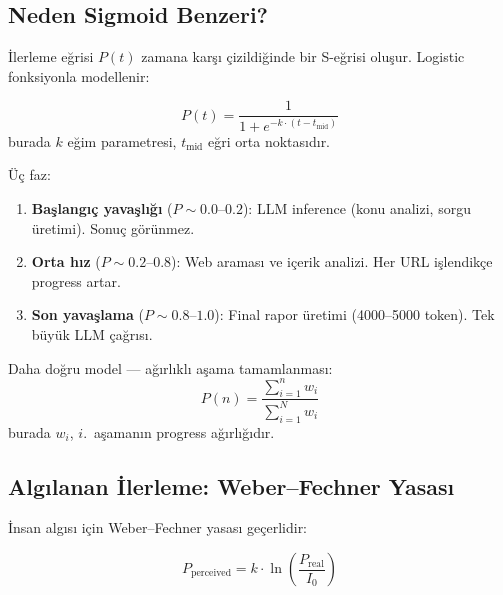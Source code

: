\subsection{Neden Sigmoid Benzeri?}

\.{I}lerleme e\u{g}risi $P(t)$ zamana kar\c{s}{\i} \c{c}izildi\u{g}inde bir S-e\u{g}risi olu\c{s}ur. Logistic fonksiyonla modellenir:

\begin{formulbox}
\begin{equation}
\label{eq:sigmoid_progress}
P(t) = \frac{1}{1 + e^{-k \cdot (t - t_{\text{mid}})}}
\end{equation}
burada $k$ e\u{g}im parametresi, $t_{\text{mid}}$ e\u{g}ri orta noktas{\i}d{\i}r.
\end{formulbox}

\"{U}\c{c} faz:\
\begin{enumerate}
  \item \textbf{Ba\c{s}lang{\i}\c{c} yava\c{s}l{\i}\u{g}{\i}} ($P \sim 0.0$--$0.2$): LLM inference (konu analizi, sorgu \"{u}retimi). Sonu\c{c} g\"{o}r\"{u}nmez.
  \item \textbf{Orta h{\i}z} ($P \sim 0.2$--$0.8$): Web aramas{\i} ve i\c{c}erik analizi. Her URL i\c{s}lendik\c{c}e progress artar.
  \item \textbf{Son yava\c{s}lama} ($P \sim 0.8$--$1.0$): Final rapor \"{u}retimi (4000--5000 token). Tek b\"{u}y\"{u}k LLM \c{c}a\u{g}r{\i}s{\i}.
\end{enumerate}

Daha do\u{g}ru model --- a\u{g}{\i}rl{\i}kl{\i} a\c{s}ama tamamlanmas{\i}:
\begin{equation}
\label{eq:weighted_progress}
P(n) = \frac{\sum_{i=1}^{n} w_i}{\sum_{i=1}^{N} w_i}
\end{equation}
burada $w_i$, $i$.~a\c{s}aman{\i}n progress a\u{g}{\i}rl{\i}\u{g}{\i}d{\i}r.

\subsection{Alg{\i}lanan \.{I}lerleme: Weber--Fechner Yasas{\i}}

\.{I}nsan alg{\i}s{\i} i\c{c}in Weber--Fechner yasas{\i} ge\c{c}erlidir:

\begin{equation}
\label{eq:weber_fechner}
P_{\text{perceived}} = k \cdot \ln\!\left(\frac{P_{\text{real}}}{I_0}\right)
\end{equation}

